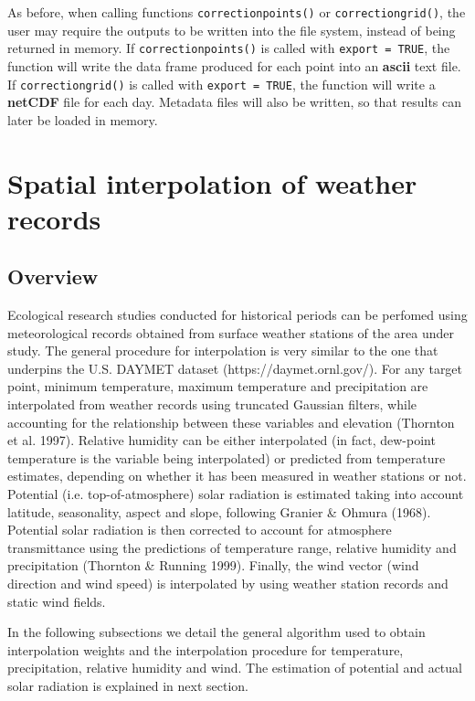 \documentclass[11pt,a4paper]{article}
\begin{document}
As before, when calling functions \texttt{correctionpoints()} or \texttt{correctiongrid()}, the user may require the outputs to be written into the file system, instead of being returned in memory. If \texttt{correctionpoints()} is called with \texttt{export = TRUE}, the function will write the data frame produced for each point into an \textbf{ascii} text file. If \texttt{correctiongrid()} is called with \texttt{export = TRUE}, the function will write a \textbf{netCDF} file for each day. Metadata files will also be written, so that results can later be loaded in memory.


\section{Spatial interpolation of weather records}
\subsection{Overview}
Ecological research studies conducted for historical periods can be perfomed using meteorological records obtained from surface weather stations of the area under study. The general procedure for interpolation is very similar to the one that underpins the U.S. DAYMET dataset (https://daymet.ornl.gov/). For any target point, minimum temperature, maximum temperature and precipitation are interpolated from weather records using truncated Gaussian filters, while accounting for the relationship between these variables and elevation (Thornton et al. 1997). Relative humidity can be either interpolated (in fact, dew-point temperature is the variable being interpolated) or predicted from temperature estimates, depending on whether it has been measured in weather stations or not. Potential (i.e. top-of-atmosphere) solar radiation is estimated taking into account latitude, seasonality, aspect and slope, following Granier \& Ohmura (1968). Potential solar radiation is then corrected to account for atmosphere transmittance using the predictions of temperature range, relative humidity and precipitation (Thornton \& Running 1999). Finally, the wind vector (wind direction and wind speed) is interpolated by using weather station records and static wind fields. 

In the following subsections we detail the general algorithm used to obtain interpolation weights and the interpolation procedure for temperature, precipitation, relative humidity and wind. The estimation of potential and actual solar radiation is explained in next section.
\end{document}
